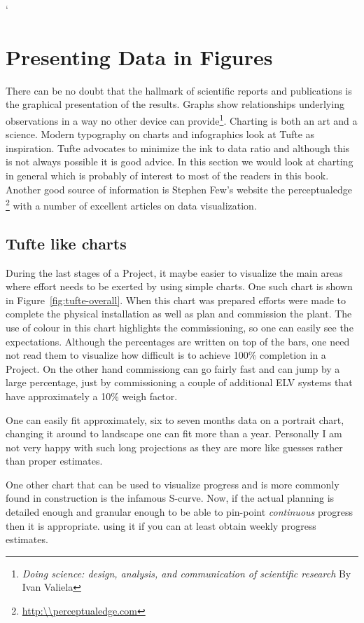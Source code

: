 `\chapter{Presenting Data in Figures}

There can be no doubt that the hallmark of scientific reports and publications is the graphical presentation of the results. Graphs show relationships underlying observations in a way no other device can provide\footnote{\textit{Doing science: design, analysis, and communication of scientific research}
 By Ivan Valiela}. 
Charting is both an art and a science. Modern typography on charts and infographics look at Tufte as inspiration.
Tufte advocates to minimize the ink to data ratio and although this is not always possible it is good advice.
In this section we would look at charting in general which is probably of interest to most of the readers
in this book.  Another good source of information is Stephen Few’s website the perceptualedge \footnote{\protect\url{http:\\perceptualedge.com}}  with a number of excellent articles on data visualization. 

\section{Tufte like charts}

During the last stages of a Project, it maybe easier to visualize the
main areas where effort needs to be exerted by using simple charts. One
such chart is shown in Figure~\ref{fig:tufte-overall}. When this chart
was prepared efforts were made to complete the physical installation
as well as plan and commission the plant. The use of colour in this
chart highlights the commissioning, so one can easily see the expectations. Although the percentages are written on top of the bars,
one need not read them to visualize how difficult is to achieve
100\% completion in a Project. On the other hand commissiong can go
fairly fast and can jump by a large percentage, just by
commissioning a couple of additional ELV systems that have approximately
a 10\% weigh factor.

One can easily fit approximately, six to seven months data on
a portrait chart, changing it around to landscape one can fit
more than a year. Personally I am not very happy with such long
projections as they are more like guesses rather than proper estimates.

One other chart that can be used to visualize progress and is more
commonly found in construction is the infamous S-curve. Now, if
the actual planning is detailed enough and granular enough to be
able to pin-point \textit{continuous} progress then it is
appropriate. using it if you can at least obtain weekly progress
estimates.


